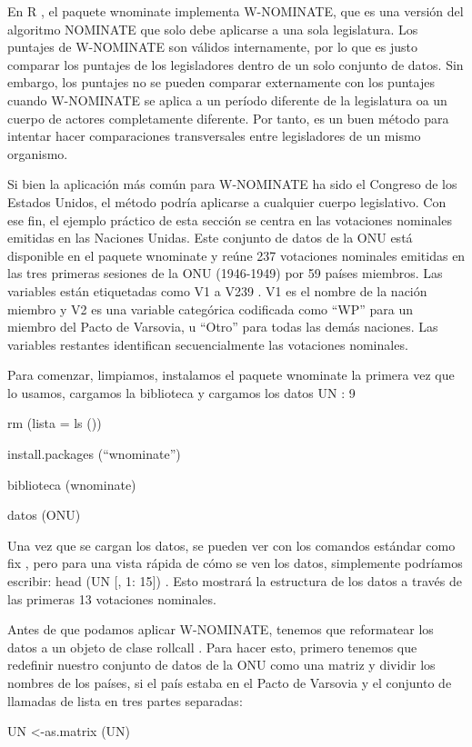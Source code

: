 \documentclass[
]{book}
\begin{document}
En R , el paquete wnominate implementa W-NOMINATE, que es una versión del algoritmo NOMINATE que solo debe aplicarse a una sola legislatura. Los puntajes de W-NOMINATE son válidos internamente, por lo que es justo comparar los puntajes de los legisladores dentro de un solo conjunto de datos. Sin embargo, los puntajes no se pueden comparar externamente con los puntajes cuando W-NOMINATE se aplica a un período diferente de la legislatura oa un cuerpo de actores completamente diferente. Por tanto, es un buen método para intentar hacer comparaciones transversales entre legisladores de un mismo organismo.

Si bien la aplicación más común para W-NOMINATE ha sido el Congreso de los Estados Unidos, el método podría aplicarse a cualquier cuerpo legislativo. Con ese fin, el ejemplo práctico de esta sección se centra en las votaciones nominales emitidas en las Naciones Unidas. Este conjunto de datos de la ONU está disponible en el paquete wnominate y reúne 237 votaciones nominales emitidas en las tres primeras sesiones de la ONU (1946-1949) por 59 países miembros. Las variables están etiquetadas como V1 a V239 . V1 es el nombre de la nación miembro y V2 es una variable categórica codificada como ``WP'' para un miembro del Pacto de Varsovia, u ``Otro'' para todas las demás naciones. Las variables restantes identifican secuencialmente las votaciones nominales.

Para comenzar, limpiamos, instalamos el paquete wnominate la primera vez que lo usamos, cargamos la biblioteca y cargamos los datos UN : 9

rm (lista = ls ())

install.packages (``wnominate'')

biblioteca (wnominate)

datos (ONU)

Una vez que se cargan los datos, se pueden ver con los comandos estándar como fix , pero para una vista rápida de cómo se ven los datos, simplemente podríamos escribir: head (UN {[}, 1: 15{]}) . Esto mostrará la estructura de los datos a través de las primeras 13 votaciones nominales.

Antes de que podamos aplicar W-NOMINATE, tenemos que reformatear los datos a un objeto de clase rollcall . Para hacer esto, primero tenemos que redefinir nuestro conjunto de datos de la ONU como una matriz y dividir los nombres de los países, si el país estaba en el Pacto de Varsovia y el conjunto de llamadas de lista en tres partes separadas:

UN \textless-as.matrix (UN)
\end{document}

